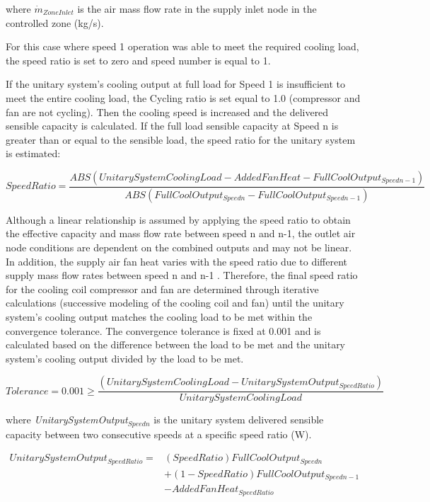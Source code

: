 where \({\dot m{_{ZoneInlet}}}\) is the air mass flow rate in the supply inlet node in the controlled zone (kg/s).

For this case where speed 1 operation was able to meet the required cooling load, the speed ratio is set to zero and speed number is equal to 1.

If the unitary system's cooling output at full load for Speed 1 is insufficient to meet the entire cooling load, the Cycling ratio is set equal to 1.0 (compressor and fan are not cycling). Then the cooling speed is increased and the delivered sensible capacity is calculated. If the full load sensible capacity at Speed n is greater than or equal to the sensible load, the speed ratio for the unitary system is estimated:

\begin{equation}
SpeedRatio = \frac{{ABS\left( {UnitarySystemCoolingLoad - AddedFanHeat - FullCoolOutpu{t_{Speedn - 1}}} \right)}}{{ABS\left( {FullCoolOutpu{t_{Speedn}} - FullCoolOutpu{t_{Speedn - 1}}} \right)}}
\end{equation}

Although a linear relationship is assumed by applying the speed ratio to obtain the effective capacity and mass flow rate between speed n and n-1, the outlet air node conditions are dependent on the combined outputs and may not be linear. In addition, the supply air fan heat varies with the speed ratio due to different supply mass flow rates between speed n and n-1 . Therefore, the final speed ratio for the cooling coil compressor and fan are determined through iterative calculations (successive modeling of the cooling coil and fan) until the unitary system's cooling output matches the cooling load to be met within the convergence tolerance. The convergence tolerance is fixed at 0.001 and is calculated based on the difference between the load to be met and the unitary system's cooling output divided by the load to be met.

\begin{equation}
Tolerance = 0.001 \ge \frac{{\left( {UnitarySystemCoolingLoad - UnitarySystemOutpu{t_{SpeedRatio}}} \right)}}{{UnitarySystemCoolingLoad}}
\end{equation}

where \emph{UnitarySystemOutput\(_{Speedn}\)} is the unitary system delivered sensible capacity between two consecutive speeds at a specific speed ratio (W).

\begin{equation}
  \begin{array}{rl}
    UnitarySystemOutput_{SpeedRatio} =& (SpeedRatio)FullCoolOutput_{Speedn} \\
                                     &+ (1 - SpeedRatio)FullCoolOutput_{Speedn - 1} \\
                                     &- AddedFanHeat_{SpeedRatio}
  \end{array}
\end{equation}

